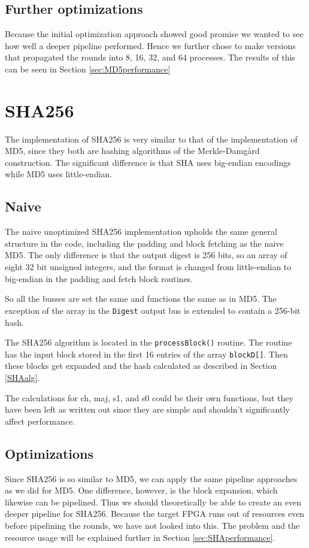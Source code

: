 \documentclass[a4paper, openany]{book}
\begin{document}
\begin{abstact}
\subsection{Further optimizations}
\label{sec:org01396f1}
Because the initial optimization approach showed good promise we wanted to see how well a deeper pipeline performed. Hence we further chose to make versions that propagated the rounds into 8, 16, 32, and 64 processes. The results of this can be seen in Section \ref{sec:MD5performance}
\section{SHA256}
\label{sec:orgdd8d5e5}
The implementation of SHA256 is very similar to that of the implementation of MD5,
since they both are hashing algorithms of the Merkle-Damgård construction.
The significant difference is that SHA uses big-endian encodings while MD5 uses little-endian.

\subsection{Naive}
\label{SHAnaive}
The naive unoptimized SHA256 implementation upholds the same general structure in the code, including the padding and block fetching as the naive MD5.
The only difference is that the output digest is 256 bits, so an array of eight 32 bit unsigned integers,
and the format is changed from little-endian to big-endian in the padding and fetch block routines.

So all the busses are set the same and functions the same as in MD5. The exception of the array in the \texttt{Digest} output bus is extended to contain a 256-bit hash.

The SHA256 algorithm is located in the \texttt{processBlock()} routine.
The routine has the input block stored in the first 16 entries of the array \texttt{blockD[]}.
Then these blocks get expanded and the hash calculated as described in Section \ref{SHAalg}.

The calculations for ch, maj, s1, and s0 could be their own functions, but they have been left as written out since they are simple and shouldn't significantly affect performance.
\subsection{Optimizations}
\label{sec:orga3cb99c}
Since SHA256 is so similar to MD5, we can apply the same pipeline approaches as we did for MD5. One difference, however, is the block expansion, which likewise can be pipelined. Thus we should theoretically be able to create an even deeper pipeline for SHA256. Because the target FPGA runs out of resources even before pipelining the rounds, we have not looked into this. The problem and the resource usage will be explained further in Section \ref{sec:SHAperformance}.

\end{abstact}
\end{document}
